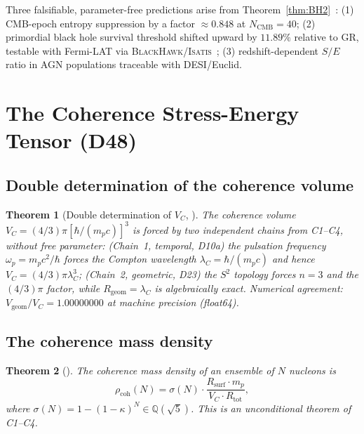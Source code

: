 \documentclass[11pt,a4paper]{article}
\theoremstyle{plain}
\newtheorem{theorem}{Theorem}[section]
\theoremstyle{definition}
\theoremstyle{remark}
\newcommand{\Rsurf}{R_{\mathrm{surf}}}
\newcommand{\Rtot}{R_{\mathrm{tot}}}
\newcommand{\sigmaN}{\sigma(N)}
\newcommand{\rhocoh}{\rho_{\mathrm{coh}}}
\begin{document}
Three falsifiable, parameter-free predictions arise from Theorem~\ref{thm:BH2}~\cite{D38}: (1) CMB-epoch entropy suppression by a factor $\approx 0.848$ at $N_{\mathrm{CMB}}=40$; (2) primordial black hole survival threshold shifted upward by $11.89\%$ relative to GR, testable with Fermi-LAT via \textsc{BlackHawk}/\textsc{Isatis}~\cite{D45}; (3) redshift-dependent $S/E$ ratio in AGN populations traceable with DESI/Euclid.

\section{The Coherence Stress-Energy Tensor (D48)}
\label{sec:Ccoh}

\subsection{Double determination of the coherence volume}
\label{subsec:VC}
\begin{theorem}[Double determination of $V_C$, \cite{D48}]
\label{thm:VC}
The coherence volume $V_C = (4/3)\pi[\hbar/(m_p c)]^3$ is forced by two independent chains from C1--C4, without free parameter: (Chain~1, temporal, D10a) the pulsation frequency $\omega_p = m_p c^2/\hbar$ forces the Compton wavelength $\lambda_C = \hbar/(m_p c)$ and hence $V_C = (4/3)\pi\lambda_C^3$; (Chain~2, geometric, D23) the $S^2$ topology forces $n=3$ and the $(4/3)\pi$ factor, while $R_{\mathrm{geom}} = \lambda_C$ is algebraically exact. Numerical agreement: $V_{\mathrm{geom}}/V_C = 1.00000000$ at machine precision (float64).
\end{theorem}

\subsection{The coherence mass density}
\label{subsec:rhocoh}
\begin{theorem}[\cite{D48}]
\label{thm:rhocoh}
The coherence mass density of an ensemble of $N$ nucleons is
\begin{equation}
\rhocoh(N) = \sigmaN \cdot \frac{\Rsurf \cdot m_p}{V_C \cdot \Rtot},
\end{equation}
where $\sigmaN = 1-(1-\kappa)^N \in \mathbb{Q}(\sqrt{5})$. This is an unconditional theorem of C1--C4.
\end{theorem}
\end{document}
